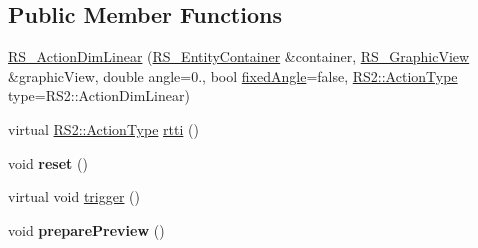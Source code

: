 \subsection*{Public Member Functions}
\begin{DoxyCompactItemize}
\item 
\hyperlink{classRS__ActionDimLinear_abbaede035159e3e9e3e6a5310de9f521}{R\-S\-\_\-\-Action\-Dim\-Linear} (\hyperlink{classRS__EntityContainer}{R\-S\-\_\-\-Entity\-Container} \&container, \hyperlink{classRS__GraphicView}{R\-S\-\_\-\-Graphic\-View} \&graphic\-View, double angle=0., bool \hyperlink{classRS__ActionDimLinear_aefb615e1a23d3fde4d44ce9b7232d2e5}{fixed\-Angle}=false, \hyperlink{classRS2_afe3523e0bc41fd637b892321cfc4b9d7}{R\-S2\-::\-Action\-Type} type=R\-S2\-::\-Action\-Dim\-Linear)
\item 
virtual \hyperlink{classRS2_afe3523e0bc41fd637b892321cfc4b9d7}{R\-S2\-::\-Action\-Type} \hyperlink{classRS__ActionDimLinear_adfb43924fa63874b8ad527998238564a}{rtti} ()
\item 
\hypertarget{classRS__ActionDimLinear_a3ba1c21fc0633f179e205e377d9fb075}{void {\bfseries reset} ()}\label{classRS__ActionDimLinear_a3ba1c21fc0633f179e205e377d9fb075}

\item 
virtual void \hyperlink{classRS__ActionDimLinear_acca601d14e09ec36d9b11dfe1b7ab349}{trigger} ()
\item 
\hypertarget{classRS__ActionDimLinear_a870c94d6575c5ef9780f62b4e538bcc5}{void {\bfseries prepare\-Preview} ()}\label{classRS__ActionDimLinear_a870c94d6575c5ef9780f62b4e538bcc5}


\end{DoxyCompactItemize}

